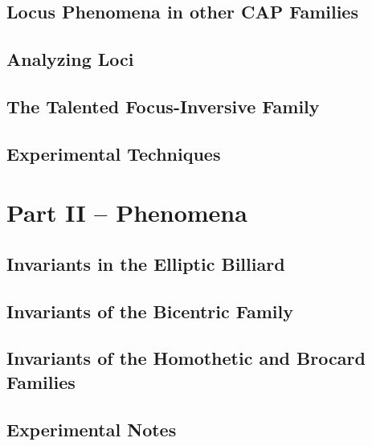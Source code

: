 \documentclass{book}
\begin{document}
\chapter[Loci in CAP Pairs]{Locus Phenomena in other CAP Families}
\label{chap:06-cap-loci}


\chapter{Analyzing Loci}
\label{chap:07-n3-loci}


\chapter{The Talented Focus-Inversive Family}
\label{chap:08-focus-inversive}


\chapter{Experimental Techniques}
\label{chap:09-experimental}


\part{Part II --  Phenomena}

\chapter[Billiard Invariants]{Invariants in the Elliptic Billiard}
\label{chap:10-billiard}
  

\chapter[Bicentric Invariants]{Invariants of the Bicentric Family}
\label{chap:11-bicentric}
%

\chapter[Homothetic and Brocard Invariants]{Invariants of the Homothetic and Brocard Families}
\label{chap:12-homoth}
%

\chapter{ Experimental Notes}
\label{chap:13-experimental}
%
\end{document}
